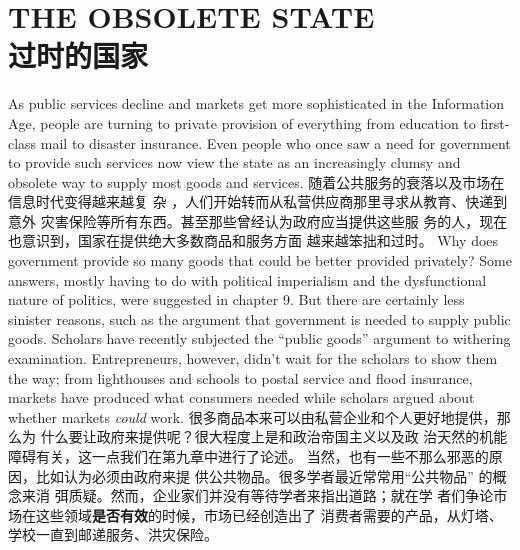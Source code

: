 \chapter{THE OBSOLETE STATE\\过时的国家}
\begin{paracol}{2}

As public services decline and markets get more sophisticated in the Information Age, people are
turning to private provision of everything from education to
first-class mail to disaster insurance. Even people who once saw
a need for government to provide such services now view the
state as an increasingly clumsy and obsolete way to supply
most goods and services.
\switchcolumn
随着公共服务的衰落以及市场在信息时代变得越来越复
杂 ，人们开始转而从私营供应商那里寻求从教育、快递到意外
灾害保险等所有东西。甚至那些曾经认为政府应当提供这些服
务的人，现在也意识到，国家在提供绝大多数商品和服务方面
越来越笨拙和过时。
\switchcolumn*
Why does government provide so many goods that could be
better provided privately? Some answers, mostly having to do
with political imperialism and the dysfunctional nature of politics, were suggested in chapter 9. But there are certainly less
sinister reasons, such as the argument that government is
needed to supply public goods. Scholars have recently subjected
the ``public goods'' argument to withering examination. Entrepreneurs, however, didn't wait for the scholars to show them the
way; from lighthouses and schools to postal service and flood insurance, markets have produced what consumers needed while
scholars argued about whether markets \textit{could} work.
\switchcolumn
很多商品本来可以由私营企业和个人更好地提供，那么为
什么要让政府来提供呢？很大程度上是和政治帝国主义以及政
治天然的机能障碍有关，这一点我们在第九章中进行了论述。
当然，也有一些不那么邪恶的原因，比如认为必须由政府来提
供公共物品。很多学者最近常常用“公共物品” 的概念来消
弭质疑。然而，企业家们并没有等待学者来指出道路；就在学
者们争论市场在这些领域\textbf{是否有效}的时候，市场已经创造出了
消费者需要的产品，从灯塔、学校一直到邮递服务、洪灾保险。


\end{paracol}
